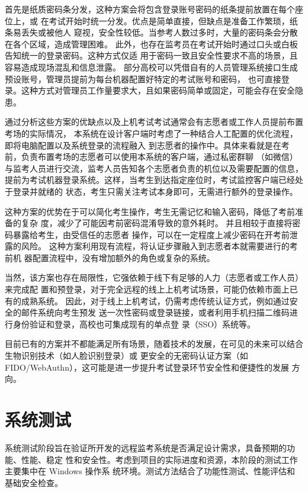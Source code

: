 首先是纸质密码条分发，这种方案会将包含登录账号密码的纸条提前放置在每个座位上，或
在考试开始时统一分发。优点是简单直接，但缺点是准备工作繁琐，纸条易丢失或被他人
窥视，安全性较低。当参考人数过多时，大量的密码条会分散在各个区域，造成管理困难。
此外，也存在监考员在考试开始时通过口头或白板告知统一的登录密码。这种方式仅适
用于密码一致且安全性要求不高的场景，且容易造成现场混乱和信息泄露。
部分高校可以凭借自有的人员管理系统接口生成预设账号，管理员提前为每台机器配置好特定的考试账号和密码，
也可直接登录。这种方式对管理员工作量要求大，且如果密码简单或固定，可能会存在安全隐患。

通过分析这些方案的优缺点以及上机考试考试通常会有志愿者或工作人员提前布置考场的实际情况，
本系统在设计客户端时考虑了一种结合人工配置的优化流程，即将电脑配置以及系统登录的流程融入
到志愿者的操作中。具体来看就是在考前，负责布置考场的志愿者可以使用本系统的客户端，通过私密群聊
（如微信）与监考人员进行交流，监考人员告知各个志愿者负责的机位以及需要配置的信息，
提前为考试机器登录系统。这样，当考生到达指定座位时，考试监控客户端已经处于登录并就绪的
状态，考生只需关注考试本身即可，无需进行额外的登录操作。

这种方案的优势在于可以简化考生操作，考生无需记忆和输入密码，降低了考前准备的复杂
度，减少了可能因考前密码混淆导致的意外耗时。
并且相较于直接将密码暴露给考生，由受信任的志愿者
操作，可以在一定程度上减少密码在开考前泄露的风险。
这种方案利用现有流程，将认证步骤融入到志愿者本就需要进行的考前机
器配置流程中，没有增加额外的角色或复杂的系统。

当然，该方案也存在局限性，它强依赖于线下有足够的人力（志愿者或工作人员）来完成配
置和预登录，对于完全远程的线上上机考试场景，可能仍依赖市面上已有的成熟系统。
因此，对于线上上机考试，仍需考虑传统认证方式，例如通过安全的邮件系统向考生预发
送一次性密码或登录链接，或者利用手机扫描二维码进行身份验证和登录，高校也可集成现有的单点登
录（SSO）系统等。

目前已有的方案并不都能满足所有场景，随着技术的发展，在可见的未来可以结合生物识别技术（如人脸识别登录）或
更安全的无密码认证方案（如 FIDO/WebAuthn），这可能是进一步提升考试登录环节安全性和便捷性的发展
方向。

\newpage    %

\section{系统测试}

系统测试阶段旨在验证所开发的远程监考系统是否满足设计需求，具备预期的功能、性能、稳定
性和安全性。考虑到项目的实际进度和资源，本阶段的测试工作主要集中在 Windows 操作系
统环境。测试方法结合了功能性测试、性能评估和基础安全检查。

